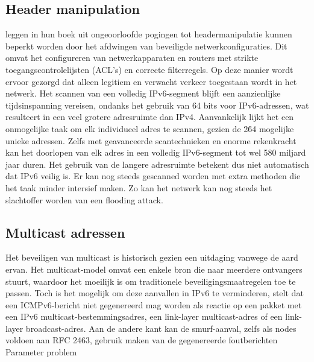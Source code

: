 \subsection{Header manipulation}
\textcite{boek1} leggen in hun boek uit ongeoorloofde pogingen tot headermanipulatie kunnen beperkt worden door het afdwingen van beveiligde netwerkconfiguraties. Dit omvat het configureren van netwerkapparaten en routers met strikte toegangscontrolelijsten (ACL's) en correcte filterregels. Op deze manier wordt ervoor gezorgd dat alleen legitiem en verwacht verkeer toegestaan wordt in het netwerk. Het scannen van een volledig IPv6-segment blijft een aanzienlijke tijdsinspanning vereisen, ondanks het gebruik van 64 bits voor IPv6-adressen, wat resulteert in een veel grotere adresruimte dan IPv4. Aanvankelijk lijkt het een onmogelijke taak om elk individueel adres te scannen, gezien de 2\^64 mogelijke unieke adressen. Zelfs met geavanceerde scantechnieken en enorme rekenkracht kan het doorlopen van elk adres in een volledig IPv6-segment tot wel 580 miljard jaar duren. \autocite{boek1} Het gebruik van de langere adresruimte betekent dus niet automatisch dat IPv6 veilig is. Er kan nog steeds gescanned worden met extra methoden die het taak minder intersief maken. Zo kan het netwerk kan nog steeds het slachtoffer worden van een flooding attack.

\subsection{Multicast adressen} 

Het beveiligen van multicast is historisch gezien een uitdaging vanwege de aard ervan. Het multicast-model omvat een enkele bron die naar meerdere ontvangers stuurt, waardoor het moeilijk is om traditionele beveiligingsmaatregelen toe te passen. \autocite{6726061} Toch is het mogelijk om deze aanvallen in IPv6 te verminderen, stelt \textcite{deering2000ipv6} dat een ICMPv6-bericht niet gegenereerd mag worden als reactie op een pakket met een IPv6 \newline multicast-bestemmingsadres, een link-layer multicast-adres of een link-layer \newline broadcast-adres. Aan de andere kant kan de smurf-aanval, zelfs als nodes voldoen aan RFC 2463, gebruik maken van de gegenereerde foutberichten Parameter problem
\newline

